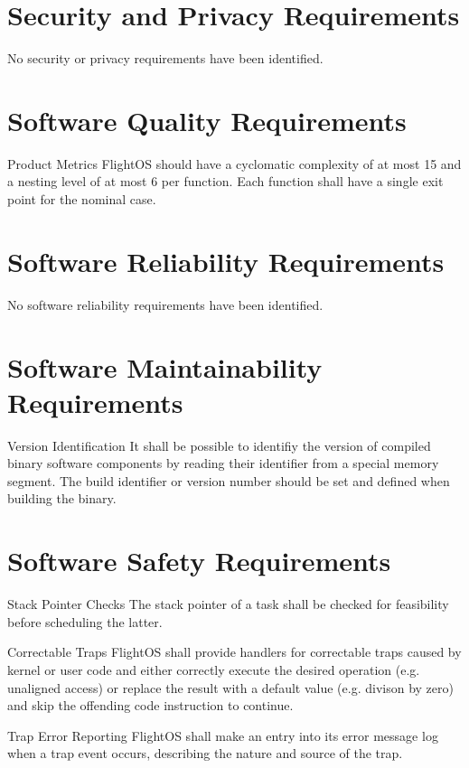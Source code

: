 \section{Security and Privacy Requirements}

No security or privacy requirements have been identified.

\section{Software Quality Requirements}

 {Product Metrics}{%
FlightOS should have a cyclomatic complexity of at most 15 and a nesting level of
at most 6 per function. Each function shall have a single exit point for the 
nominal case.
}{}%

\section{Software Reliability Requirements}

No software reliability requirements have been identified.

\section{Software Maintainability Requirements}

 {Version Identification}{%
It shall be possible to identifiy the version of compiled binary software
components by reading their identifier from a special memory segment.
}{
The build identifier or version number should be set and defined when building
the binary.
}%


\section{Software Safety Requirements}

 {Stack Pointer Checks}{%
The stack pointer of a task shall be checked for feasibility before scheduling
the latter.
}{
}%

 {Correctable Traps}{%
FlightOS shall provide handlers for correctable traps caused by kernel or user
code and either correctly execute the desired operation (e.g. unaligned access)
or replace the result with a default value (e.g. divison by zero) and skip the
offending code instruction to continue.
}{
}

 {Trap Error Reporting}{%
FlightOS shall make an entry into its error message log when a trap event occurs,
describing the nature and source of the trap.
}{
}



